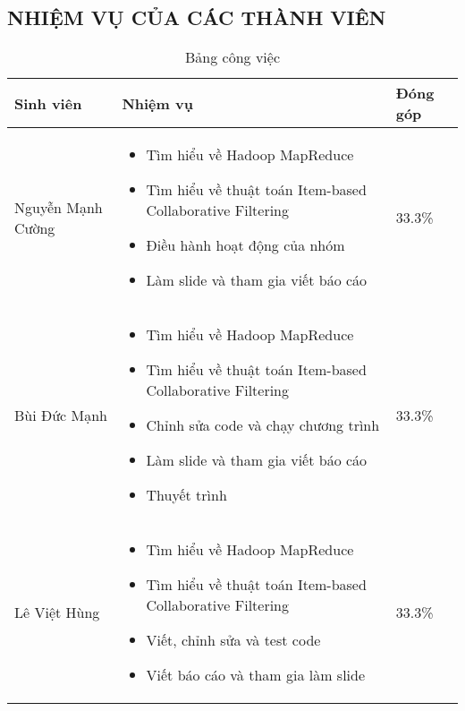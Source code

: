 \vfill
\begin{center}
    \section*{NHIỆM VỤ CỦA CÁC THÀNH VIÊN}
\end{center}
\vspace{0.5cm}
\begin{table}[h!]
    \centering
    \hspace*{-1.2cm}
    \begin{tabular}{|l|p{10cm}|l|}
        \hline
        \textbf{Sinh viên} & \textbf{Nhiệm vụ}  & \textbf{Đóng góp}                       \\
        \hline
        Nguyễn Mạnh Cường  &
        \begin{itemize}
            \item Tìm hiểu về Hadoop MapReduce
            \item Tìm hiểu về thuật toán Item-based Collaborative Filtering
            \item Điều hành hoạt động của nhóm
            \item Làm slide và tham gia viết báo cáo
        \end{itemize} & 33.3\% \\
        \hline
        Bùi Đức Mạnh       &
        \begin{itemize}
            \item Tìm hiểu về Hadoop MapReduce
            \item Tìm hiểu về thuật toán Item-based Collaborative Filtering
            \item Chỉnh sửa code và chạy chương trình
            \item Làm slide và tham gia viết báo cáo
            \item Thuyết trình
        \end{itemize} & 33.3\% \\
        \hline
        Lê Việt Hùng       &
        \begin{itemize}
            \item Tìm hiểu về Hadoop MapReduce
            \item Tìm hiểu về thuật toán Item-based Collaborative Filtering
            \item Viết, chỉnh sửa và test code
            \item Viết báo cáo và tham gia làm slide
        \end{itemize} & 33.3\% \\
        \hline
    \end{tabular}
    \caption{Bảng công việc}
    \label{tab:my_label}
\end{table}